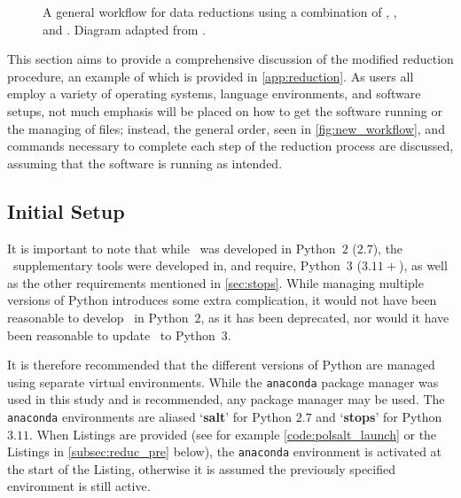 \begin{figure}[t]
    \caption{A general workflow for data reductions using a combination of \polsalt, \iraf, and \stops. Diagram adapted from \cite{Cooper_HEASA2021}.}
    \label{fig:new_workflow}
\end{figure}

This section aims to provide a comprehensive discussion of the modified reduction procedure, an example of which is provided in \autoref{app:reduction}. As users all employ a variety of operating systems, language environments, and software setups, not much emphasis will be placed on how to get the software running or the managing of files; instead, the general order, seen in \autoref{fig:new_workflow}, and commands necessary to complete each step of the reduction process are discussed, assuming that the software is running as intended.

\subsection{Initial Setup} \label{subsec:reduc_setup}

It is important to note that while \polsalt\ was developed in Python~$2$ ($2.7$), the \stops\ supplementary tools were developed in, and require, Python~$3$ ($3.11+$), as well as the other requirements mentioned in \autoref{sec:stops}. While managing multiple versions of Python introduces some extra complication, it would not have been reasonable to develop \stops\ in Python~$2$, as it has been deprecated, nor would it have been reasonable to update \polsalt\ to Python~$3$.

It is therefore recommended that the different versions of Python are managed using separate virtual environments. While the \texttt{anaconda} package manager was used in this study and is recommended, any package manager may be used. The \texttt{anaconda} environments are aliased `\textbf{salt}' for Python $2.7$ and `\textbf{stops}' for Python $3.11$. When Listings are provided (see for example \autoref{code:polsalt_launch} or the Listings in \autoref{subsec:reduc_pre} below), the \texttt{anaconda} environment is activated at the start of the Listing, otherwise it is assumed the previously specified environment is still active.

